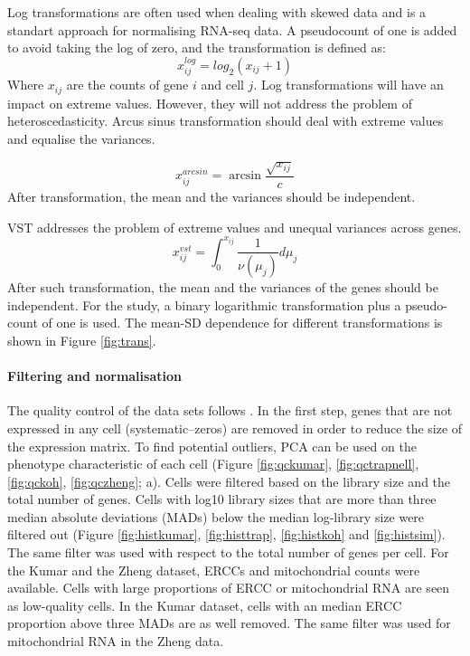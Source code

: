 \documentclass[11pt, a4paper]{article}\usepackage[]{graphicx}\usepackage[]{color}
\begin{document}
Log transformations are often used when dealing with skewed data and is a standart approach for normalising RNA-seq data. A pseudocount of one is added to avoid taking the log of zero, and the transformation is defined as:
\begin{equation}
x_{ij}^{log} = log_{2}(x_{ij} + 1)
\end{equation}
Where $x_{ij}$ are the counts of gene $i$ and cell $j$. Log transformations will have an impact on extreme values. However, they will not address the problem of heteroscedasticity. Arcus sinus transformation should deal with extreme values and equalise the variances. 

\begin{equation}
x_{ij}^{arcsin} = \arcsin \frac{\sqrt{x_{ij}} }{c}
\end{equation}
After transformation, the mean and the variances should be independent. 

VST addresses the problem of extreme values and unequal variances across genes.  
\begin{equation}
x_{ij}^{vst} = \int_{0}^{x_{ij}} \frac{1}{\nu(\mu_j)} d\mu_j
\end{equation}
After such transformation, the mean and the variances of the genes should be independent. For the study, a binary logarithmic transformation plus a pseudo-count of one is used.  The mean-SD dependence for different transformations is shown in Figure \ref{fig:trans}.

\newpage
\paragraph{Filtering and normalisation}
The quality control of the data sets follows \citet{lun2016step}. In the first step, genes that are not expressed in any cell (systematic--zeros) are removed in order to reduce the size of the expression matrix. To find potential outliers, PCA can be used on the phenotype characteristic of each cell (Figure \ref{fig:qckumar}, \ref{fig:qctrapnell}, \ref{fig:qckoh}, \ref{fig:qczheng}; a). Cells were filtered based on the library size and the total number of genes.
Cells with log10 library sizes that are more than three median absolute deviations (MADs) below the median log-library size were filtered out (Figure \ref{fig:histkumar}, \ref{fig:histtrap}, \ref{fig:histkoh} and \ref{fig:histsim}). The same filter was used with respect to the total number of genes per cell. 
For the Kumar and the Zheng dataset, ERCCs and mitochondrial counts were available. Cells with large proportions of ERCC or mitochondrial RNA are seen as low-quality cells. In the Kumar dataset, cells with an median ERCC proportion above three MADs are as well removed. The same filter was used for mitochondrial RNA in the Zheng data.
\end{document}
